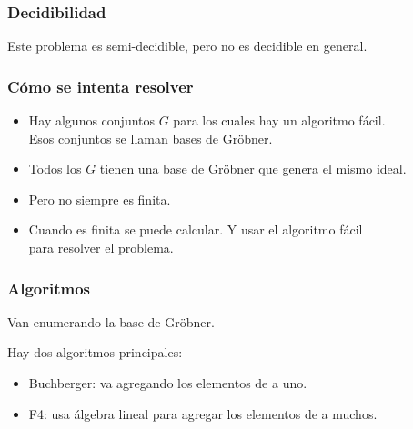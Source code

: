 \documentclass[spanish, aspectratio=169, hidecontrols]{beamer}
\begin{document}
\begin{frame}
  \frametitle{Decidibilidad}
  \pause
  Este problema es semi-decidible\pause, pero no es decidible en general.
\end{frame}

\begin{frame}
  \frametitle{Cómo se intenta resolver}
  \begin{itemize}
    \item Hay algunos conjuntos $G$ para los cuales hay un algoritmo fácil. \pause \\
    Esos conjuntos se llaman bases de Gröbner.
    \pause
    \item Todos los $G$ tienen una base de Gröbner que genera el mismo ideal.
    \pause
    \item Pero no siempre es finita.
    \pause
    \item Cuando es finita se puede calcular. \pause Y usar el algoritmo fácil \\ para resolver el problema.
  \end{itemize}
\end{frame}




\begin{frame}
  \frametitle{Algoritmos}
  \pause

  Van enumerando la base de Gröbner.

  \pause
  Hay dos algoritmos principales:
  \pause
  \begin{itemize}
    \item Buchberger: \pause va agregando los elementos de a uno.
    \item F4: \pause usa álgebra lineal para agregar los elementos de a muchos.
  \end{itemize}
\end{frame}
\end{document}
